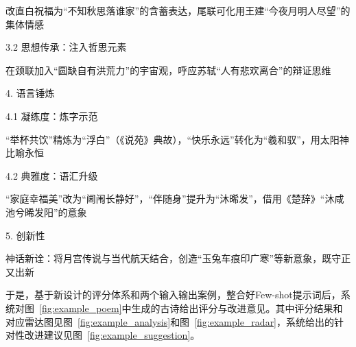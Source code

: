 \begin{tcolorbox}[
  breakable,            %
  colback=white, %
  colframe=black, 
  boxrule=1pt,        %
  arc=0mm             %
  ]
  \hspace{2em}改直白祝福为“不知秋思落谁家”的含蓄表达，尾联可化用王建“今夜月明人尽望”的集体情感\par
  \hspace{2em}3.2 思想传承：注入哲思元素\par
  \hspace{2em}在颈联加入“圆缺自有洪荒力”的宇宙观，呼应苏轼“人有悲欢离合”的辩证思维\par
  4. 语言锤炼\par
  \hspace{2em}4.1 凝练度：炼字示范\par
  \hspace{2em}“举杯共饮”精炼为“浮白”（《说苑》典故），“快乐永远”转化为“羲和驭”，用太阳神比喻永恒\par
  \hspace{2em}4.2 典雅度：语汇升级\par
  \hspace{2em}“家庭幸福美”改为“阃闱长静好”，“伴随身”提升为“沐晞发”，借用《楚辞》“沐咸池兮晞发阳”的意象\par
  5. 创新性\par
  \hspace{2em}神话新诠：将月宫传说与当代航天结合，创造“玉兔车痕印广寒”等新意象，既守正又出新\par

\end{tcolorbox}


于是，基于新设计的评分体系和两个输入输出案例，整合好Few-shot提示词后，系统对图~\ref{fig:example_poem}中生成的古诗给出评分与改进意见。其中评分结果和对应雷达图见图~\ref{fig:example_analysis}和图~\ref{fig:example_radar}，系统给出的针对性改进建议见图~\ref{fig:example_suggestion}。

